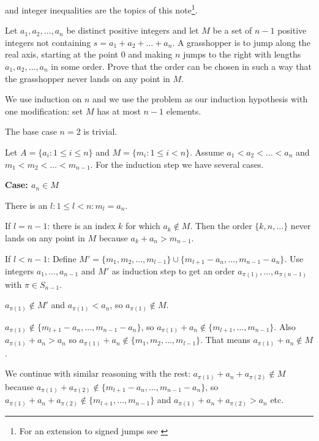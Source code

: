  and integer inequalities are the topics of this note\footnote{For an extension to signed jumps see \cite{SignedGrasshopper}}.

\vspace{10 mm}
\begin{problem}
Let $a_1, a_2, \ldots, a_n$ be distinct positive integers and let $M$ be a set of $n-1$ positive integers not containing $s = a_1 + a_2 + \ldots + a_n$. A grasshopper is to jump along the real axis, starting at the point $0$ and making $n$ jumps to the right with lengths $a_1, a_2, \ldots, a_n$ in some order. Prove that the order can be chosen in such a way that the grasshopper never lands on any point in $M$. 
\end{problem}

We use induction on $n$ and we use the problem as our induction hypothesis with one modification: set $M$ has at most $n-1$ elements.

The base case $n=2$ is trivial.

Let $A = \{a_i: 1 \leq i \leq n\}$ and $M= \{m_i: 1 \leq i < n\}$. Assume $a_1 < a_2 < \ldots < a_n$ and $m_1 < m_2 < \ldots < m_{n-1}$.  For the induction step we have several cases.

\noindent \textbf{Case: $a_n \in M$}

There is an $l : 1 \leq l < n: m_l = a_n$.

If $l = n - 1$: there is an index $k$ for which $a_k \notin M$. Then the order $\{k, n, \ldots\}$ never lands on any point in $M$ because $a_k + a_n > m_{n-1}$.

If $l < n - 1$: Define $M' = \{m_1, m_2, \ldots, m_{l-1}\} \cup \{m_{l+1} - a_n, \ldots, m_{n-1} - a_n\}$. Use integers $a_1, \ldots, a_{n-1}$ and $M'$ as induction step to get an order $a_{\pi(1)}, \ldots, a_{\pi(n-1)}$ with $\pi \in S_{n-1}$.

$a_{\pi(1)} \notin M'$ and $a_{\pi(1)} < a_n$, so $a_{\pi(1)} \notin M$.

$a_{\pi(1)} \notin \{m_{l+1} - a_n, \ldots, m_{n-1} - a_n\}$, so $a_{\pi(1)} + a_n \notin \{m_{l+1}, \ldots, m_{n-1}\}$. Also $a_{\pi(1)} + a_n > a_n$ so $a_{\pi(1)} + a_n \notin \{m_1, m_2, \ldots, m_{l-1}\}$. That means $a_{\pi(1)} + a_n \notin M$.

We continue with similar reasoning with the rest: $a_{\pi(1)} + a_n + a_{\pi(2)} \notin M$ because $a_{\pi(1)} + a_{\pi(2)} \notin \{m_{l+1} - a_n, \ldots, m_{n-1} - a_n\}$, so  $a_{\pi(1)} + a_n + a_{\pi(2)} \notin \{m_{l+1}, \ldots, m_{n-1}\}$ and $a_{\pi(1)} + a_n + a_{\pi(2)} > a_n$ etc. 

